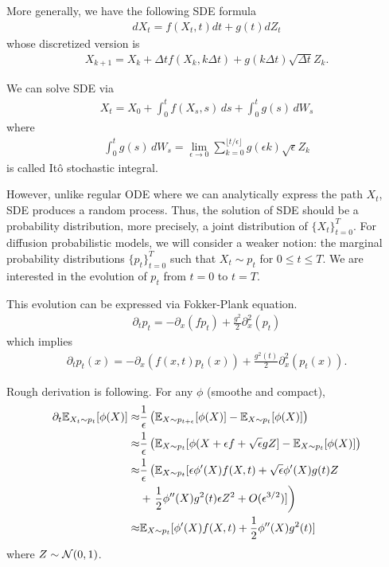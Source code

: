 \documentclass[11pt]{article}
\begin{document}
More generally, we have the following SDE formula
\begin{align}
    dX_t = f(X_t, t)dt + g(t) dZ_t
\end{align}
whose discretized version is
\begin{align}
    X_{k+1} = X_k + \Delta t f(X_k, k\Delta t) + g(k\Delta t)\sqrt{\Delta t}Z_k.
\end{align}

We can solve SDE via
\begin{align}
    X_t = X_0 + \int_0^t f(X_s, s)\, ds + \int_0^t g(s)\, dW_s
\end{align}
where 
\begin{align}
    \int_0^t g(s)\, dW_s = \lim_{\epsilon\rightarrow 0} \sum_{k=0}^{\lfloor t/\epsilon\rfloor} g(\epsilon k) \sqrt{\epsilon}Z_{k}
\end{align}
is called It\^o stochastic integral.

However, unlike regular ODE where we can analytically express the path $X_t$, SDE produces a random process.
Thus, the solution of SDE should be a probability distribution,
more precisely, a joint distribution of $\{X_t\}_{t=0}^T$.
For diffusion probabilistic models, we will consider a weaker notion: the marginal probability
distributions $\{p_t\}_{t=0}^T$ such that $X_t\sim p_t$ for $0\leq t\leq T$.
We are interested in the evolution of $p_t$ from $t=0$ to $t=T$.

This evolution can be expressed via Fokker-Plank equation.
\begin{align}
    \partial_t p_t = -\partial_x(fp_t) + \frac{g^2}{2}\partial_x^2 (p_t)
\end{align}
which implies
\begin{align}
    \partial_t p_t(x) = -\partial_x(f(x, t)p_t(x)) + \frac{g^2(t)}{2}\partial_x^2 (p_t(x)).
\end{align}

Rough derivation is following.
For any $\phi$ (smoothe and compact),
\begin{align}
    \partial_t\mathbb{E}_{X_t\sim p_t} [\phi(X)]
    \approx&  \frac{1}{\epsilon}\left(\mathbb{E}_{X\sim p_{t+\epsilon}} [\phi(X)] - \mathbb{E}_{X\sim p_{t}} [\phi(X)]\right)\\
    \approx&  \frac{1}{\epsilon}\left(\mathbb{E}_{X\sim p_{t}} [\phi(X + \epsilon f +\sqrt{\epsilon}gZ] - \mathbb{E}_{X\sim p_{t}} [\phi(X)]\right)\\
    \approx&  \frac{1}{\epsilon}\left(\mathbb{E}_{X\sim p_{t}} [\epsilon \phi'(X) f(X, t) + \sqrt{\epsilon}\phi'(X)g(t)Z\right.\nonumber\\
    &+ \left.\frac{1}{2}\phi''(X)g^2(t)\epsilon Z^2 + O(\epsilon^{3/2})]\right)\\
    \approx&  \mathbb{E}_{X\sim p_{t}} [\phi'(X) f(X, t) +  \frac{1}{2}\phi''(X)g^2(t)]
\end{align}
where $Z\sim {\cal N}(0, 1)$.
\end{document}
